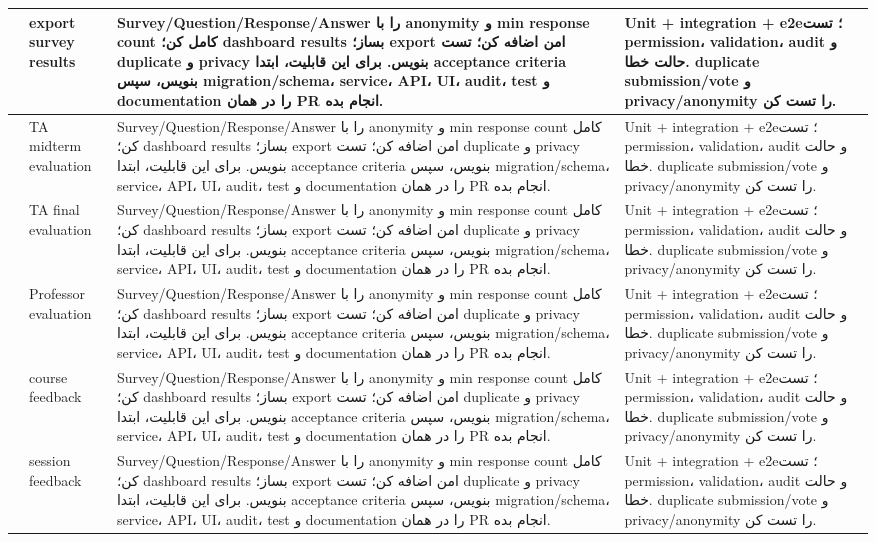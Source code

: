 \documentclass[11pt,a4paper]{article}
\begin{document}
\begin{longtable}{|>{\raggedleft\arraybackslash}p{}|>{\raggedleft\arraybackslash}p{}|>{\raggedleft\arraybackslash}p{}|>{\raggedleft\arraybackslash}p{}|}
172 & export survey results & Survey/Question/Response/Answer را با anonymity و min response count کامل کن؛ dashboard results بساز؛ export امن اضافه کن؛ تست duplicate و privacy بنویس. برای این قابلیت، ابتدا acceptance criteria بنویس، سپس migration/schema، service، API، UI، audit، test و documentation را در همان PR انجام بده. & Unit + integration + e2e؛ تست permission، validation، audit و حالت خطا. duplicate submission/vote و privacy/anonymity را تست کن. \\ \hline
173 & TA midterm evaluation & Survey/Question/Response/Answer را با anonymity و min response count کامل کن؛ dashboard results بساز؛ export امن اضافه کن؛ تست duplicate و privacy بنویس. برای این قابلیت، ابتدا acceptance criteria بنویس، سپس migration/schema، service، API، UI، audit، test و documentation را در همان PR انجام بده. & Unit + integration + e2e؛ تست permission، validation، audit و حالت خطا. duplicate submission/vote و privacy/anonymity را تست کن. \\ \hline
174 & TA final evaluation & Survey/Question/Response/Answer را با anonymity و min response count کامل کن؛ dashboard results بساز؛ export امن اضافه کن؛ تست duplicate و privacy بنویس. برای این قابلیت، ابتدا acceptance criteria بنویس، سپس migration/schema، service، API، UI، audit، test و documentation را در همان PR انجام بده. & Unit + integration + e2e؛ تست permission، validation، audit و حالت خطا. duplicate submission/vote و privacy/anonymity را تست کن. \\ \hline
175 & Professor evaluation & Survey/Question/Response/Answer را با anonymity و min response count کامل کن؛ dashboard results بساز؛ export امن اضافه کن؛ تست duplicate و privacy بنویس. برای این قابلیت، ابتدا acceptance criteria بنویس، سپس migration/schema، service، API، UI، audit، test و documentation را در همان PR انجام بده. & Unit + integration + e2e؛ تست permission، validation، audit و حالت خطا. duplicate submission/vote و privacy/anonymity را تست کن. \\ \hline
176 & course feedback & Survey/Question/Response/Answer را با anonymity و min response count کامل کن؛ dashboard results بساز؛ export امن اضافه کن؛ تست duplicate و privacy بنویس. برای این قابلیت، ابتدا acceptance criteria بنویس، سپس migration/schema، service، API، UI، audit، test و documentation را در همان PR انجام بده. & Unit + integration + e2e؛ تست permission، validation، audit و حالت خطا. duplicate submission/vote و privacy/anonymity را تست کن. \\ \hline
177 & session feedback & Survey/Question/Response/Answer را با anonymity و min response count کامل کن؛ dashboard results بساز؛ export امن اضافه کن؛ تست duplicate و privacy بنویس. برای این قابلیت، ابتدا acceptance criteria بنویس، سپس migration/schema، service، API، UI، audit، test و documentation را در همان PR انجام بده. & Unit + integration + e2e؛ تست permission، validation، audit و حالت خطا. duplicate submission/vote و privacy/anonymity را تست کن. \\ \hline

\end{longtable}
\end{document}
